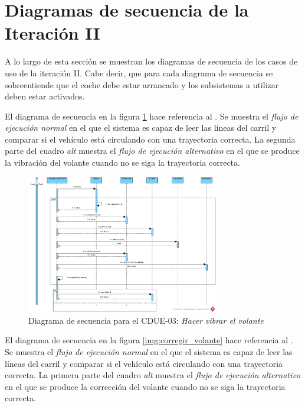 \section{Diagramas de secuencia de la Iteración II}

\par A lo largo de esta sección se muestran los diagramas de secuencia de los casos de uso de la iteración II. Cabe decir, que para cada diagrama de secuencia se sobreentiende que el coche debe estar arrancado y los subsistemas a utilizar deben estar activados.

\par El diagrama de secuencia  en la figura \ref{img:vibrar_volante} hace referencia al . Se muestra el \textit{flujo de ejecución normal} en el que el sistema es capaz de leer las líneas del carril y comparar si el vehículo está circulando con una trayectoria correcta. La segunda parte del cuadro \textit{alt} muestra el \textit{flujo de ejecución alternativo} en el que se produce la vibración del volante cuando no se siga la trayectoria correcta.

\begin{figure}[h]
  \begin{center}
    \includegraphics[width=0.75\textwidth]{./img/diagramas_de_secuencia/CDUE-03.png}
  \end{center}
  \caption{Diagrama de secuencia para el CDUE-03: \textit{Hacer vibrar el volante}}
  \label{img:vibrar_volante}
\end{figure}


\par El diagrama de secuencia  en la figura \ref{img:corregir_volante} hace referencia al . Se muestra el \textit{flujo de ejecución normal} en el que el sistema es capaz de leer las líneas del carril y comparar si el vehículo está circulando con una trayectoria correcta. La primera parte del cuadro \textit{alt} muestra el \textit{flujo de ejecución alternativo} en el que se produce la corrección del volante cuando no se siga la trayectoria correcta.

